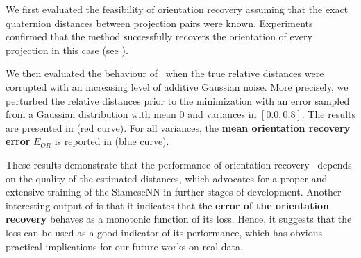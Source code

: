 We first evaluated the feasibility of orientation recovery assuming that the exact quaternion distances between projection pairs were known.
Experiments confirmed that the method successfully recovers the orientation of every projection in this case (see ).

We then evaluated the behaviour of~ when the true relative distances were corrupted with an increasing level of additive Gaussian noise. More precisely, we perturbed the relative distances prior to the minimization with an error sampled from a Gaussian distribution with mean 0 and variances in $[0.0, 0.8]$.
The results are presented in  (red curve).
For all variances, the \textbf{mean orientation recovery error} $E_{OR}$ is reported in  (blue curve).



These results demonstrate that the performance of orientation recovery~ depends on the quality of the estimated distances, which advocates for a proper and extensive training of the SiameseNN in further stages of development.
Another interesting output of  is that it indicates that the \textbf{error of the orientation recovery} behaves as a monotonic function of its loss.
Hence, it suggests that the loss can be used as a good indicator of its performance, which has obvious practical implications for our future works on real data.

